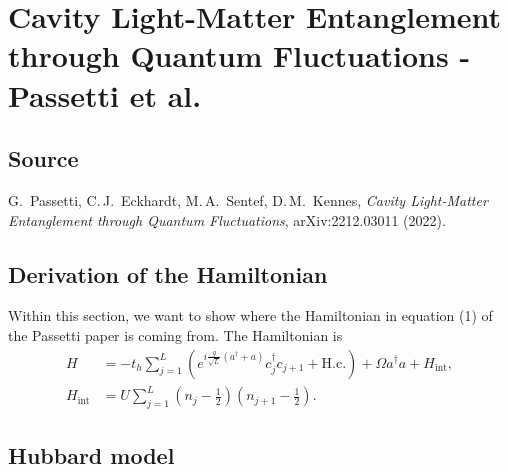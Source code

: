 \documentclass[../../main.tex]{subfiles}
\begin{document}
\section{Cavity Light-Matter Entanglement through Quantum Fluctuations - Passetti et al.}
\label{sec:passetti2022}

\subsection*{Source}
G.\ Passetti, C.\,J.\ Eckhardt, M.\,A.\ Sentef, D.\,M.\ Kennes,
\emph{Cavity Light-Matter Entanglement through Quantum Fluctuations},
arXiv:2212.03011 (2022). 



\subsection{Derivation of the Hamiltonian}
\label{subsec:passetti2022-model}

Within this section, we want to show where the Hamiltonian in equation (1) of the Passetti paper is coming from. The Hamiltonian is
\begin{align}
H&=-t_h\sum_{j=1}^{L}\left(
e^{i\frac{g}{\sqrt L}(a^\dagger+a)}c_j^\dagger c_{j+1}
+\mathrm{H.c.}\right)+\Omega a^\dagger a+H_{\mathrm{int}},
\label{eq:passetti2022-claim}\\
H_{\mathrm{int}}&=U\sum_{j=1}^{L}
\left(n_j-\frac12\right)\left(n_{j+1}-\frac12\right).
\end{align}

\subsection*{Hubbard model}
\end{document}
